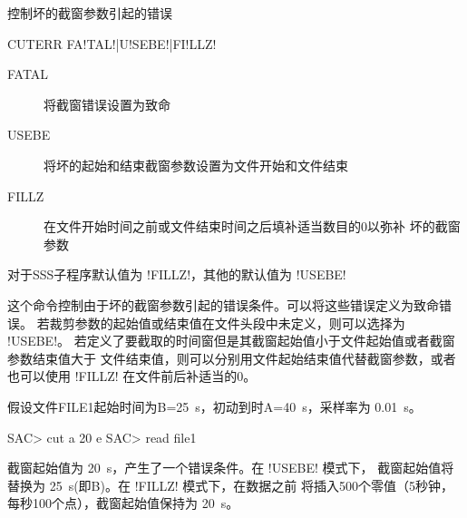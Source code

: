 \label{cmd:cuterr}

控制坏的截窗参数引起的错误

\begin{SACSTX}
CUTERR FA!TAL!|U!SEBE!|FI!LLZ!
\end{SACSTX}

\begin{description}
\item [FATAL] 将截窗错误设置为致命
\item [USEBE] 将坏的起始和结束截窗参数设置为文件开始和文件结束
\item [FILLZ] 在文件开始时间之前或文件结束时间之后填补适当数目的0以弥补
    坏的截窗参数
\end{description}

对于SSS子程序默认值为 !FILLZ!，其他的默认值为 !USEBE!

这个命令控制由于坏的截窗参数引起的错误条件。可以将这些错误定义为致命错误。
若裁剪参数的起始值或结束值在文件头段中未定义，则可以选择为 !USEBE!。
若定义了要截取的时间窗但是其截窗起始值小于文件起始值或者截窗参数结束值大于
文件结束值，则可以分别用文件起始结束值代替截窗参数，或者也可以使用
!FILLZ! 在文件前后补适当的0。

假设文件FILE1起始时间为B=\SI{25}{s}，初动到时A=\SI{40}{s}，采样率为 \SI{0.01}{s}。
\begin{SACCode}
SAC> cut a 20 e
SAC> read file1
\end{SACCode}
截窗起始值为 \SI{20}{s}，产生了一个错误条件。在 !USEBE! 模式下，
截窗起始值将替换为 \SI{25}{s}(即B)。在 !FILLZ! 模式下，在数据之前
将插入500个零值（5秒钟，每秒100个点），截窗起始值保持为 \SI{20}{s}。
